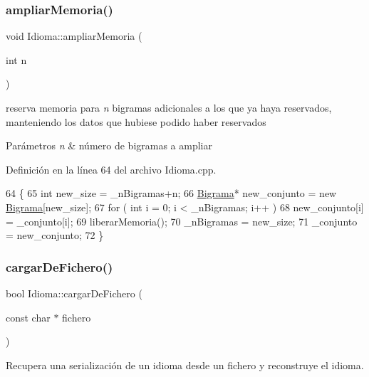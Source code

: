 \subsubsection{\texorpdfstring{ampliar\+Memoria()}{ampliarMemoria()}}
{\footnotesize\ttfamily void Idioma\+::ampliar\+Memoria (\begin{DoxyParamCaption}\item[{int}]{n }\end{DoxyParamCaption})}



reserva memoria para {\itshape n} bigramas adicionales a los que ya haya reservados, manteniendo los datos que hubiese podido haber reservados 


\begin{DoxyParams}{Parámetros}
{\em n} & número de bigramas a ampliar \\
\hline
\end{DoxyParams}


Definición en la línea 64 del archivo Idioma.\+cpp.


\begin{DoxyCode}
64                                  \{
65     \textcolor{keywordtype}{int} new\_size = \_nBigramas+n;
66     \hyperlink{classBigrama}{Bigrama}* new\_conjunto = \textcolor{keyword}{new} \hyperlink{classBigrama}{Bigrama}[new\_size];
67     \textcolor{keywordflow}{for} ( \textcolor{keywordtype}{int} i = 0; i < \_nBigramas; i++ )
68         new\_conjunto[i] = \_conjunto[i];
69     liberarMemoria();
70     \_nBigramas = new\_size;
71     \_conjunto = new\_conjunto;
72 \}
\end{DoxyCode}
\mbox{\label{classIdioma_ab012e232b14198714f83372f43bf1eae}} 
\subsubsection{\texorpdfstring{cargar\+De\+Fichero()}{cargarDeFichero()}}
{\footnotesize\ttfamily bool Idioma\+::cargar\+De\+Fichero (\begin{DoxyParamCaption}\item[{const char $\ast$}]{fichero }\end{DoxyParamCaption})}



Recupera una serialización de un idioma desde un fichero y reconstruye el idioma. 


